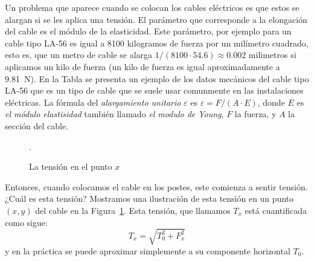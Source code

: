Un problema que aparece cuando se colocan los cables eléctricos es que
estos se alargan si se les aplica una tensión. El parámetro que
corresponde a la elongación del cable es el módulo de la
elasticidad. Este parámetro, por ejemplo para un cable tipo LA-56 es
igual a 8100 kilogramos de fuerza por un milímetro cuadrado, esto es,
que un metro de cable se alarga $1/(8100\cdot 54.6)\approx 0.002$
milimetros si aplicamos un kilo de fuerza (un kilo de fuerza es igual
aproximadamente a \SI{9.81}{N}). En la Tabla se presenta
un ejemplo de los datos mecánicos del cable tipo LA-56 que es un tipo de cable que se suele
usar comunmente en las instalaciones eléctricas. La fórmula del \emph{alargamiento unitario} $\varepsilon$ es
$\varepsilon=F/(A\cdot E)$, donde $E$ es \emph{el módulo elastisidad}
también llamado \emph{el modulo de Young}, $F$ la fuerza, y $A$ la
sección del cable.



\begin{figure}
  \vspace{-0.7cm}
  \begin{figurebox}
    \centering
    \caption{La tensión en el punto $x$}.
    \label{fig:5}
  \end{figurebox}
   \vspace{-1cm}
\end{figure}


Entonces, cuando colocamos el cable en los postes, este comienza a
sentir tensión. ¿Cuál es esta tensión? Mostramos una ilustración de
esta tensión en un punto $(x,y)$ del cable en la
Figura~\ref{fig:5}. Esta tensión, que llamamos $T_x$ está cuantificada
como sigue:
\begin{displaymath}
  T_x=\sqrt{T_0^2+F_x^2}
\end{displaymath}
y en la práctica se puede aproximar simplemente a su componente horizontal $T_0$.

